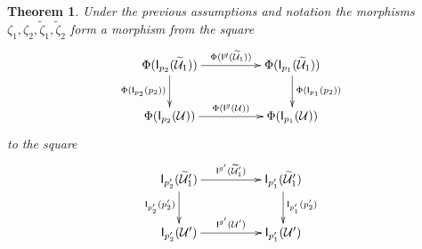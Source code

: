\documentclass[12pt]{article}
\numberwithin{equation}{section}
\newtheorem{theorem}[proposition]{Theorem}
\newcommand{\wt}{\widetilde}
\newcommand{\U}{\mathcal{U}}
\newcommand{\I}{\mathsf{I}}
\begin{document}
%
\begin{theorem}
\label{2015.04.10.th3} Under the previous assumptions and notation the
morphisms $\zeta_1,\zeta_2,\wt{\zeta}_1,\wt{\zeta}_2$ form a morphism from the
square
%
$$
\begin{xy}
          \xymatrix@C=4pc{ \Phi(\I_{p_2}(\wt{\U}_1))
            \ar[r]^-{\Phi(\I^g(\wt{\U}_1))} \ar[d]_{\Phi(\I_{p_2}(p_2))} &
            \Phi(\I_{p_1}(\wt{\U}_1))
            \ar[d]^{\Phi(\I_{p_1}(p_2))}\\ \Phi(\I_{p_2}(\U))
            \ar[r]^{\Phi(\I^g(\U))} & \Phi(\I_{p_1}(\U)) }
\end{xy}
$$
%
to the square
%
$$
\begin{xy}
          \xymatrix@C=4pc{
                 \I_{p_2'}(\wt{\U}_1')   \ar[r]^-{\I^{g'}(\wt{\U}_1')} \ar[d]_{\I_{p_2'}(p_2')} & 
                 \I_{p_1'}(\wt{\U}_1') \ar[d]^{\I_{p_1'}(p_2')}\\
		\I_{p_2'}(\U')   \ar[r]^{\I^{g'}(\U')} &
		\I_{p_1'}(\U')
                }
\end{xy}
$$
%
\end{theorem}
%
\end{document}

